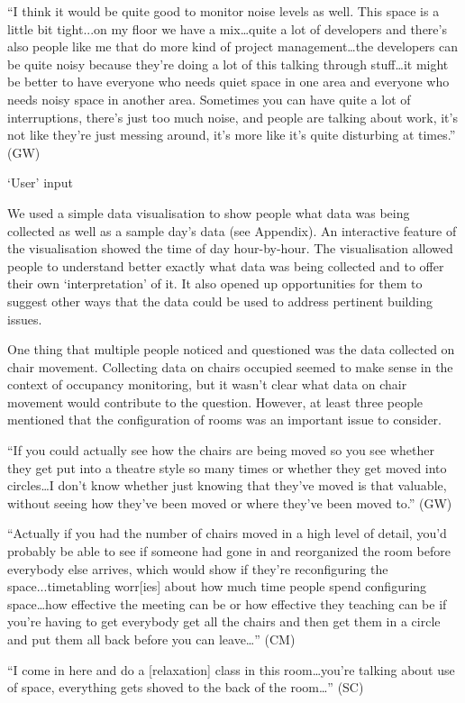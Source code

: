 “I think it would be quite good to monitor noise levels as well. This
space is a little bit tight...on my floor we have a mix…quite a lot of
developers and there’s also people like me that do more kind of
project management…the developers can be quite noisy because they’re
doing a lot of this talking through stuff…it might be better to have
everyone who needs quiet space in one area and everyone who needs
noisy space in another area. Sometimes you can have quite a lot of
interruptions, there’s just too much noise, and people are talking
about work, it’s not like they’re just messing around, it’s more like
it’s quite disturbing at times.” (GW)

‘User’ input

We used a simple data visualisation to show people what data was being collected as well as a sample day’s data (see Appendix). An interactive feature of the visualisation showed the time of day hour-by-hour.
The visualisation allowed people to understand better exactly what
data was being collected and to offer their own ‘interpretation’ of
it. It also opened up opportunities for them to suggest other ways
that the data could be used to address pertinent building issues.

One thing that multiple people noticed and questioned was the data
collected on chair movement. Collecting data on chairs occupied seemed
to make sense in the context of occupancy monitoring, but it wasn’t
clear what data on chair movement would contribute to the
question. However, at least three people mentioned that the
configuration of rooms was an important issue to consider.

“If you could actually see how the chairs are being moved so you see whether they get put into a theatre style so many times or whether they get moved into circles…I don’t know whether just knowing that they’ve moved is that valuable, without seeing how they’ve been moved or where they’ve been moved to.” (GW)

“Actually if you had the number of chairs moved in a high level of detail, you’d probably be able to see if someone had gone in and reorganized the room before everybody else arrives, which would show if they’re reconfiguring the space...timetabling worr[ies] about how much time people spend configuring space…how effective the meeting can be or how effective they teaching can be if you’re having to get everybody get all the chairs and then get them in a circle and put them all back before you can leave…” (CM)

“I come in here and do a [relaxation] class in this room…you’re talking about use of space, everything gets shoved to the back of the room…” (SC)

